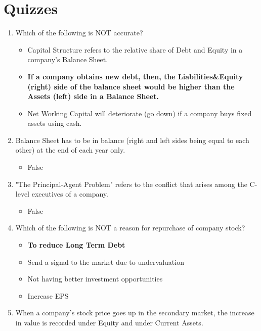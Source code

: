 \section{Quizzes}
\begin{scriptsize}
  \begin{enumerate}[itemsep=0em]
    \item Which of the following is NOT accurate?
          \begin{itemize}[itemsep=0em]
            \item Capital Structure refers to the relative share of Debt and Equity in a company's Balance Sheet.
            \item \textbf{If a company obtains new debt, then, the Liabilities\&Equity (right) side of the balance sheet would be higher than the Assets (left) side in a Balance Sheet.}
            \item Net Working Capital will deteriorate (go down) if a company buys fixed assets using cash.
          \end{itemize}
    \item Balance Sheet has to be in balance (right and left sides being equal to each other) at the end of each year only.
          \begin{itemize}[itemsep=0em]
            \item False
          \end{itemize}
    \item "The Principal-Agent Problem" refers to the conflict that arises among the C-level executives of a company.
          \begin{itemize}[itemsep=0em]
            \item False
          \end{itemize}
    \item Which of the following is NOT a reason for repurchase of company stock?
          \begin{itemize}[itemsep=0em]
            \item \textbf{To reduce Long Term Debt}
            \item Send a signal to the market due to undervaluation
            \item Not having better investment opportunities
            \item Increase EPS
          \end{itemize}
    \item When a company's stock price goes up in the secondary market, the increase in value is recorded under Equity and under Current Assets.

\end{enumerate}
\end{scriptsize}
